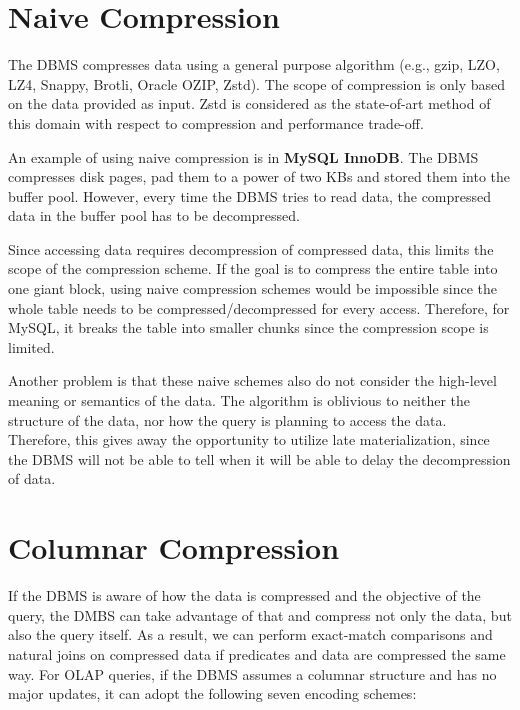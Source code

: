 \documentclass[11pt]{article}
\begin{document}
\section{Naive Compression}
The DBMS compresses data using a general purpose algorithm (e.g., gzip, LZO, LZ4, Snappy,
Brotli, Oracle OZIP, Zstd). The scope of compression is only based on the data provided as input. Zstd is considered as the state-of-art method of this domain with respect to compression and performance trade-off.

An example of using naive compression is in \textbf{MySQL InnoDB}. The DBMS compresses disk
pages, pad them to a power of two KBs and stored them into the buffer pool. However, every time the
DBMS tries to read data, the compressed data in the buffer pool has to be decompressed.

Since accessing data requires decompression of compressed data, this limits the scope of the
compression scheme. If the goal is to compress the entire table into one giant block, using naive
compression schemes would be impossible since the whole table needs to be compressed/decompressed
for every access. Therefore, for MySQL, it breaks the table into smaller chunks since the
compression scope is limited.

Another problem is that these naive schemes also do not consider the high-level meaning or
semantics of the data. The algorithm is oblivious to neither the structure of the data, nor how the
query is planning to access the data. Therefore, this gives away the opportunity to utilize late
materialization, since the DBMS will not be able to tell when it will be able to delay the
decompression of data.

\section{Columnar Compression}
If the DBMS is aware of how the data is compressed and the objective of the query, the DMBS can
take advantage of that and compress not only the data, but also the query itself. As a result, we
can perform exact-match comparisons and natural joins on compressed data if predicates and
data are compressed the same way.
For OLAP queries, if the DBMS assumes a columnar structure and has no major updates, it can adopt the following seven encoding schemes:

\end{document}
